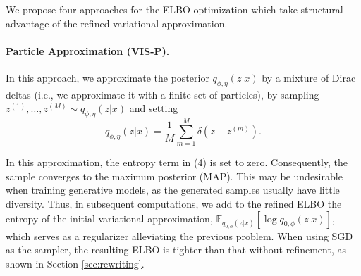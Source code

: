 We propose four approaches for the ELBO optimization 
which take structural advantage of the refined variational approximation.

    \paragraph{Particle Approximation (VIS-P).} %
    
    In this approach, we approximate the posterior $q_{\phi,\eta}(z|x)$ by a mixture of Dirac deltas (i.e., we approximate it with a finite set of particles), by sampling $z^{(1)}, \ldots, z^{(M)} \sim q_{\phi,\eta}(z|x)$ and setting 
    $$
    q_{\phi,\eta}(z|x) = \frac{1}{M} \sum_{m=1}^M \delta(z - z^{(m)}).
    $$
    
    { In this approximation, the entropy term in (4) %
    is set to zero. Consequently,  the sample converges to the 
    maximum posterior (MAP).} This may be undesirable when training generative models, as the generated samples usually have little diversity. Thus, in subsequent computations, we add to the refined ELBO the entropy of the initial variational approximation, $\mathbb{E}_{q_{0,\phi}(z|x)} \left[ \log q_{0,\phi}(z | x) \right]$, which
    serves as a regularizer alleviating the previous problem. When using SGD as the sampler, the resulting ELBO is tighter than that without refinement,
    as shown in Section \ref{sec:rewriting}. 
    
    
    
